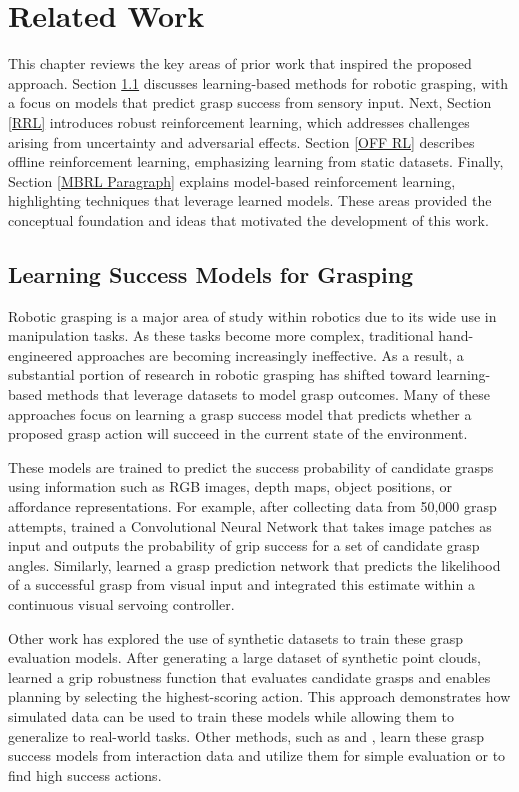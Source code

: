 \documentclass[./dissertation.tex]{subfiles}
\begin{document}
\chapter{Related Work}
This chapter reviews the key areas of prior work that inspired the proposed approach. Section \ref{RW Grasp} discusses learning-based methods for robotic grasping, with a focus on models that predict grasp success from sensory input. Next, Section \ref{RRL} introduces robust reinforcement learning, which addresses challenges arising from uncertainty and adversarial effects. Section \ref{OFF RL} describes offline reinforcement learning, emphasizing learning from static datasets. Finally, Section \ref{MBRL Paragraph} explains model-based reinforcement learning, highlighting techniques that leverage learned models. These areas provided the conceptual foundation and ideas that motivated the development of this work.

\section{Learning Success Models for Grasping}
\label{RW Grasp}
Robotic grasping is a major area of study within robotics due to its wide use in manipulation tasks. As these tasks become more complex, traditional hand-engineered approaches are becoming increasingly ineffective. As a result, a substantial portion of research in robotic grasping has shifted toward learning-based methods that leverage datasets to model grasp outcomes. Many of these approaches focus on learning a grasp success model that predicts whether a proposed grasp action will succeed in the current state of the environment.

These models are trained to predict the success probability of candidate grasps using information such as RGB images, depth maps, object positions, or affordance representations. For example, after collecting data from 50,000 grasp attempts, \cite{SSS} trained a Convolutional Neural Network that takes image patches as input and outputs the probability of grip success for a set of candidate grasp angles. Similarly, \cite{LevineGrasp} learned a grasp prediction network that predicts the likelihood of a successful grasp from visual input and integrated this estimate within a continuous visual servoing controller. 

Other work has explored the use of synthetic datasets to train these grasp evaluation models. After generating a large dataset of synthetic point clouds, \cite{DexNet} learned a grip robustness function that evaluates candidate grasps and enables planning by selecting the highest-scoring action. This approach demonstrates how simulated data can be used to train these models while allowing them to generalize to real-world tasks. Other methods, such as \cite{DSGD} and \cite{detry2011learning}, learn these grasp success models from interaction data and utilize them for simple evaluation or to find high success actions.
\end{document}
